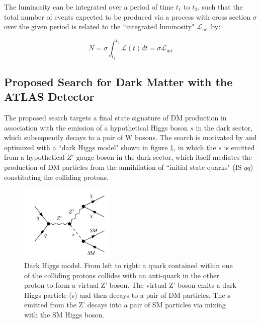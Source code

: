 \documentclass[12pt]{article}
\begin{document}
The luminosity can be integrated over a period of time $t_1$ to $t_2$, such that the total number of events expected to be produced via a process with cross section $\sigma$ over the given period is related to the ``integrated luminosity" $\mathcal{L}_\text{int}$ by:

\begin{equation}
N = \sigma\int_{t_1}^{t_2}\mathcal{L}(t)dt = \sigma\mathcal{L}_\text{int}
\end{equation}

\subsection{Proposed Search for Dark Matter with the ATLAS Detector}

The proposed search targets a final state signature of DM production in association with the emission of a hypothetical Higgs boson $s$ in the dark sector, which subsequently decays to a pair of W bosons. The search is motivated by and optimized with a ``dark Higgs model" \cite{dark_Higgs} shown in figure \ref{fig:signal_model}, in which the $s$ is emitted from a hypothetical $Z'$ gauge boson in the dark sector, which itself mediates the production of DM particles from the annihilation of ``initial state quarks" (IS $qq$) constituting the colliding protons.  

\begin{figure}[H]
	\centering
	\includegraphics[width=0.4\textwidth]{figures/Signal_generic.png}
	\caption[]{Dark Higgs model. From left to right: a quark contained within one of the colliding protons collides with an anti-quark in the other proton to form a virtual Z' boson. The virtual Z' boson emits a dark Higgs particle (s) and then decays to a pair of DM particles. The s emitted from the Z' decays into a pair of SM particles via mixing with the SM Higgs boson.}
	\label{fig:signal_model}
\end{figure}
\end{document}
